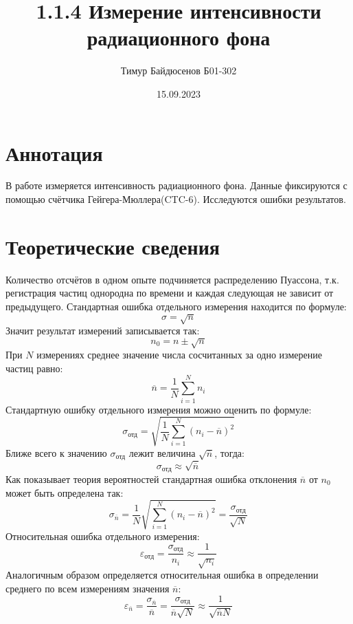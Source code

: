 \documentclass[a4paper,12pt]{article}
\title{1.1.4 Измерение интенсивности радиационного фона}
\author{Тимур Байдюсенов Б01-302}
\date{15.09.2023}
\begin{document}
\maketitle

\section{Аннотация}
В работе измеряется интенсивность радиационного фона. Данные фиксируются с помощью счётчика Гейгера-Мюллера(CTC-6). Исследуются ошибки результатов.

\section{Теоретические сведения}
Количество отсчётов в одном опыте подчиняется распределению Пуассона, т.к. регистрация частиц однородна по времени и каждая следующая не зависит от предыдущего.
Стандартная ошибка отдельного измерения находится по формуле:
\begin{equation}
\sigma=\sqrt{n}
\end{equation}
Значит результат измерений записывается так: 
\begin{equation}
n_0=n\pm\sqrt{n}
\end{equation}
При $N$ измерениях среднее значение числа сосчитанных за одно измерение частиц равно:
\begin{equation}
\overline{n}=\frac{1}{N}\sum_{i=1}^{N} {n_i}
\end{equation} 
Стандартную ошибку отдельного измерения можно оценить по формуле: 
\begin{equation}
\sigma_{\mbox{отд}}=\sqrt{\frac{1}{N}\sum_{i=1}^{N}{(n_i-\overline{n})^2}}
\end{equation}
Ближе всего к значению $ \sigma_{\mbox{отд}} $ лежит величина $ \sqrt{\overline{n}} $, тогда:
\begin{equation}
\sigma_{\mbox{отд}} \approx \sqrt{{\overline{n}}}
\end{equation}
Как показывает теория вероятностей стандартная ошибка отклонения $\overline{n}$ от $n_0$ может быть определена так:
\begin{equation}
\sigma_{\overline{n}}=\frac{1}{N}\sqrt{\sum_{i=1}^N{(n_i-\overline{n})^2}}=\frac{\sigma_{\mbox{отд}}}{\sqrt{N}}
\end{equation}
Относительная ошибка отдельного измерения:
\begin{equation}
\varepsilon_{\mbox{отд}}=\frac{\sigma_{\mbox{отд}}}{n_i} \approx \frac{1}{\sqrt{n_i}}
\end{equation}
Аналогичным образом определяется относительная ошибка в определении среднего по всем измерениям значения $\overline{n}$:
\begin{equation}
\varepsilon_{\overline{n}}=\frac{\sigma_{\overline{n}}}{\overline{n}}=\frac{\sigma_{\mbox{отд}}}{\overline{n}\sqrt{N}}\approx\frac{1}{\sqrt{\overline{n}N}}
\end{equation}
\end{document}
